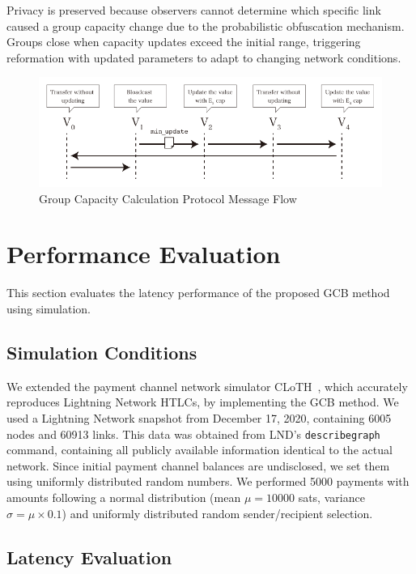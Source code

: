 \documentclass[conference]{IEEEtran}
\begin{document}
Privacy is preserved because observers cannot determine which specific link caused a group capacity change due to the probabilistic obfuscation mechanism.
Groups close when capacity updates exceed the initial range, triggering reformation with updated parameters to adapt to changing network conditions.

\begin{figure}[htbp]
	\centerline{\includegraphics[width=\linewidth]{fig/group_cap_handover}}
	\caption{Group Capacity Calculation Protocol Message Flow}
	\label{fig:group_cap_handover}
\end{figure}

\section{Performance Evaluation}

This section evaluates the latency performance of the proposed GCB method using simulation.

\subsection{Simulation Conditions}
We extended the payment channel network simulator CLoTH~\cite{CONOSCENTI2021100717}, which accurately reproduces Lightning Network HTLCs, by implementing the GCB method.
We used a Lightning Network snapshot from December 17, 2020, containing 6005 nodes and 60913 links.
This data was obtained from LND's \texttt{describegraph} command, containing all publicly available information identical to the actual network.
Since initial payment channel balances are undisclosed, we set them using uniformly distributed random numbers.
We performed 5000 payments with amounts following a normal distribution (mean $\mu = 10000$ sats, variance $\sigma = \mu \times 0.1$) and uniformly distributed random sender/recipient selection.

\subsection{Latency Evaluation}
\end{document}
